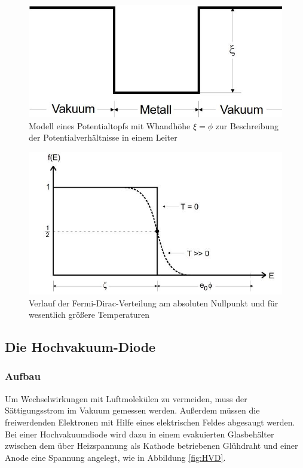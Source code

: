 \begin{figure}
\centering
\includegraphics[width=\linewidth-70pt,height=\textheight-70pt,keepaspectratio]{content/images/Pot.jpg}
\caption{Modell eines Potentialtopfs mit Whandhöhe $\xi = \phi$ zur Beschreibung der Potentialverhältnisse in einem Leiter\cite{V504}}
\label{fig:pot}
\end{figure}

\begin{figure}
\centering
\includegraphics[width=\linewidth-70pt,height=\textheight-70pt,keepaspectratio]{content/images/fermi.jpg}
\caption{Verlauf der Fermi-Dirac-Verteilung am absoluten Nullpunkt und für wesentlich größere Temperaturen\cite{V504}\label{fig:fermi}}
\end{figure}

\subsection{Die Hochvakuum-Diode}
\subsubsection{Aufbau}
\noindent Um Wechselwirkungen mit Luftmolekülen zu vermeiden, muss der Sättigungsstrom im Vakuum gemessen werden. Außerdem müssen die freiwerdenden Elektronen mit Hilfe eines elektrischen Feldes abgesaugt werden.
Bei einer Hochvakuumdiode wird dazu in einem evakuierten Glasbehälter zwischen dem über Heizspannung als Kathode betriebenen Glühdraht und einer Anode eine Spannung angelegt, wie in Abbildung \ref{fig:HVD}.

